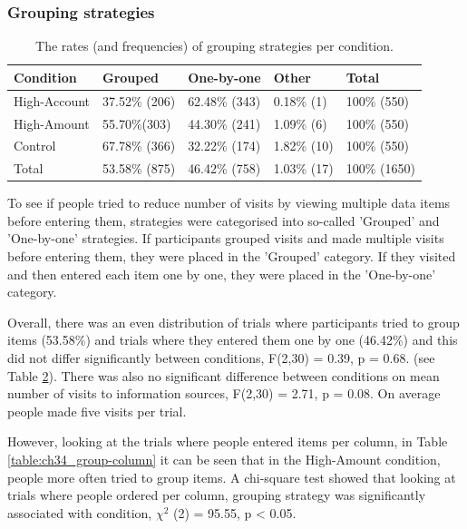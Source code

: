 \begin{table}
\begin{itemize}
\subsubsection{Grouping strategies}
\begin{table}[!ht]
\centering
\begin{tabular}{|l|l|l|l|l|}
\hline
Condition    & Grouped       & One-by-one   & Other  & Total      \\ \hline
High-Account & 37.52\% {\footnotesize (206)} & 62.48\% {\footnotesize (343)}  & 0.18\% {\footnotesize(1)}  &  100\% {\footnotesize (550)}  \\ \hline
High-Amount  & 55.70\%{\footnotesize  (303)} & 44.30\% {\footnotesize (241)}  & 1.09\% {\footnotesize(6)}  & 100\% {\footnotesize (550)}  \\ \hline
Control      & 67.78\% {\footnotesize (366)} & 32.22\% {\footnotesize (174)}  & 1.82\% {\footnotesize(10)}  & 100\% {\footnotesize (550)}  \\ \hline
Total        & 53.58\% {\footnotesize (875)} & 46.42\% {\footnotesize (758)} & 1.03\% {\footnotesize(17)} & 100\% {\footnotesize (1650)} \\ \hline
\end{tabular}
\caption{The rates (and frequencies) of grouping strategies per condition.}\label{table:ch34_group-total}
\end{table}

To see if people tried to reduce number of visits by viewing multiple data items before entering them, strategies were categorised into so-called 'Grouped' and 'One-by-one' strategies. If participants grouped visits and made multiple visits before entering them, they were placed in the 'Grouped' category. If they visited and then entered each item one by one, they were placed in the 'One-by-one' category.

Overall, there was an even distribution of trials where participants tried to group items (53.58\%) and trials where they entered them one by one (46.42\%) and this did not differ significantly between conditions, F(2,30) = 0.39, p = 0.68. (see Table \ref{table:ch34_group-total}). There was also no significant difference between conditions on mean number of visits to information sources, F(2,30) = 2.71, p = 0.08. On average people made five visits per trial.

However, looking at the trials where people entered items per column, in Table \ref{table:ch34_group-column} it can be seen that in the High-Amount condition, people more often tried to group items. A chi-square test showed that looking at trials where people ordered per column, grouping strategy was significantly associated with condition, $\chi^2$ (2) = 95.55, p < 0.05. 


\end{itemize}
\end{table}
